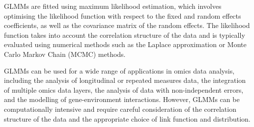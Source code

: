 \documentclass[
]{book}
\begin{document}
GLMMs are fitted using maximum likelihood estimation, which involves optimising the likelihood function with respect to the fixed and random effects coefficients, as well as the covariance matrix of the random effects. The likelihood function takes into account the correlation structure of the data and is typically evaluated using numerical methods such as the Laplace approximation or Monte Carlo Markov Chain (MCMC) methods.

GLMMs can be used for a wide range of applications in omics data analysis, including the analysis of longitudinal or repeated measures data, the integration of multiple omics data layers, the analysis of data with non-independent errors, and the modelling of gene-environment interactions. However, GLMMs can be computationally intensive and require careful consideration of the correlation structure of the data and the appropriate choice of link function and distribution.

\small
\end{document}
